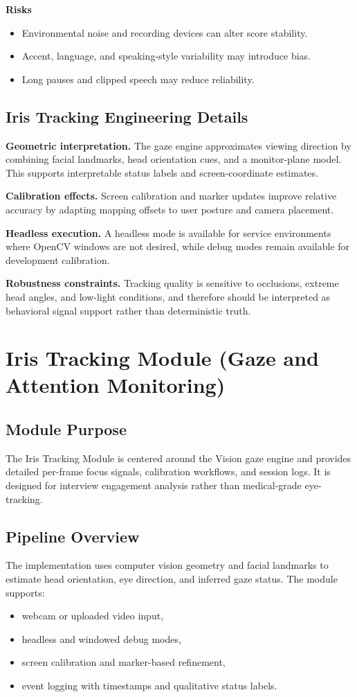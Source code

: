 \documentclass[12pt,a4paper]{report}
\begin{document}
\textbf{Risks}
\begin{itemize}[leftmargin=1.5em]
\item Environmental noise and recording devices can alter score stability.
\item Accent, language, and speaking-style variability may introduce bias.
\item Long pauses and clipped speech may reduce reliability.
\end{itemize}

\section{Iris Tracking Engineering Details}
\textbf{Geometric interpretation.} The gaze engine approximates viewing direction by combining facial landmarks, head orientation cues, and a monitor-plane model. This supports interpretable status labels and screen-coordinate estimates.

\textbf{Calibration effects.} Screen calibration and marker updates improve relative accuracy by adapting mapping offsets to user posture and camera placement.

\textbf{Headless execution.} A headless mode is available for service environments where OpenCV windows are not desired, while debug modes remain available for development calibration.

\textbf{Robustness constraints.} Tracking quality is sensitive to occlusions, extreme head angles, and low-light conditions, and therefore should be interpreted as behavioral signal support rather than deterministic truth.

\chapter{Iris Tracking Module (Gaze and Attention Monitoring)}
\section{Module Purpose}
The Iris Tracking Module is centered around the Vision gaze engine and provides detailed per-frame focus signals, calibration workflows, and session logs. It is designed for interview engagement analysis rather than medical-grade eye-tracking.

\section{Pipeline Overview}
The implementation uses computer vision geometry and facial landmarks to estimate head orientation, eye direction, and inferred gaze status. The module supports:
\begin{itemize}[leftmargin=1.5em]
\item webcam or uploaded video input,
\item headless and windowed debug modes,
\item screen calibration and marker-based refinement,
\item event logging with timestamps and qualitative status labels.
\end{itemize}
\end{document}
